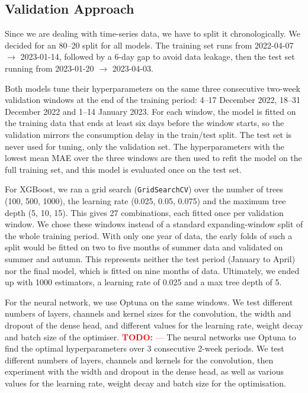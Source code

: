 \documentclass[11pt,a4paper]{article}
\newcommand{\todo}[1]{\textcolor{red}{\textbf{TODO:} #1}}
\begin{document}
\subsection{Validation Approach}
\label{sec:validation}
Since we are dealing with time-series data, we have to split it chronologically. We decided for an 80--20 split for all models. The training set runs from 2022-04-07 $\rightarrow$ 2023-01-14, followed by a 6-day gap to avoid data leakage, then the test set running  from 2023-01-20 $\rightarrow$ 2023-04-03.

Both models tune their hyperparameters on the same three consecutive two-week validation windows at the end of the training period: 4--17 December 2022, 18--31 December 2022 and 1--14 January 2023. For each window, the model is fitted on the training data that ends at least six days before the window starts, so the validation mirrors the consumption delay in the train/test split. The test set is never used for tuning, only the validation set. The hyperparameters with the lowest mean MAE over the three windows are then used to refit the model on the full training set, and this model is evaluated once on the test set.

For XGBoost, we ran a grid search (\texttt{GridSearchCV}) over the number of trees (100, 500, 1000), the learning rate (0.025, 0.05, 0.075) and the maximum tree depth (5, 10, 15). This gives 27 combinations, each fitted once per validation window. We chose these windows instead of a standard expanding-window split of the whole training period. With only one year of data, the early folds of such a split would be fitted on two to five months of summer data and validated on summer and autumn. This represents neither the test period (January to April) nor the final model, which is fitted on nine months of data. Ultimately, we ended up with 1000 estimators, a learning rate of 0.025 and a max tree depth of 5.

For the neural network, we use Optuna on the same windows. We test different numbers of layers, channels and kernel sizes for the convolution, the width and dropout of the dense head, and different values for the learning rate, weight decay and batch size of the optimiser.
\todo{---}
The neural networks use Optuna to find the optimal hyperparameters over 3 consecutive 2-week periods. We test different numbers of layers, channels and kernels for the convolution, then experiment with the width and dropout in the dense head, as well as various values for the learning rate, weight decay and batch size for the optimisation.
\end{document}
